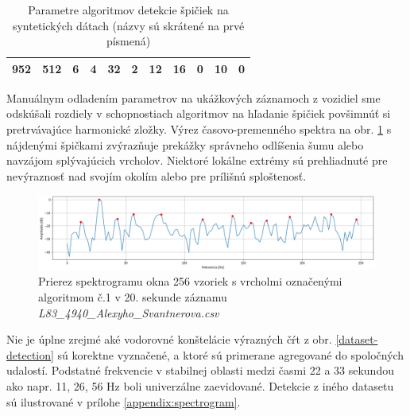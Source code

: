 \begin{table}[h]
\begin{tabular}{|c|c|ccc|cc|cccc|}
952                                                                               & 512                                                                     & \multicolumn{1}{c|}{6}           & \multicolumn{1}{c|}{4}                  & 32                & \multicolumn{1}{c|}{2}                                 & 12                                & \multicolumn{1}{c|}{16}  & \multicolumn{1}{c|}{0}   & \multicolumn{1}{c|}{10}  & 0   \\ \hline
\end{tabular}
\caption{Parametre algoritmov detekcie špičiek na syntetických dátach (názvy sú skrátené na prvé písmená)}
\label{tab:grid-serach-parameters}
\end{table}

Manuálnym odladením parametrov na ukážkových záznamoch z vozidiel sme odskúšali rozdiely v schopnostiach algoritmov
na hľadanie špičiek povšimnúť si pretrvávajúce harmonické zložky. Výrez časovo-premenného spektra na obr. \ref{spectrum-slice}
s nájdenými špičkami zvýrazňuje prekážky správneho odlíšenia šumu alebo navzájom splývajúcich vrcholov. Niektoré lokálne extrémy
sú prehliadnuté pre nevýraznosť nad svojím okolím alebo pre prílišnú sploštenosť.
\begin{figure}[h]
   \centering
    \includegraphics[width=\textwidth]{figures/verification/L83-slice-t-20-A1.png}
   \caption{Prierez spektrogramu okna 256 vzoriek s vrcholmi označenými algoritmom č.1
   v 20. sekunde záznamu \emph{L83\_4940\_Alexyho\_Svantnerova.csv}}
   \label{spectrum-slice}
\end{figure}

Nie je úplne zrejmé aké vodorovné konštelácie výrazných čŕt z obr. \ref{dataset-detection} sú korektne vyznačené,
a ktoré sú primerane agregované do spoločných udalostí. Podstatné frekvencie v stabilnej oblasti medzi časmi 22 a 33
sekundou ako napr. 11, 26, 56 Hz  boli univerzálne zaevidované. Detekcie z iného datasetu sú ilustrované v prílohe
\ref{appendix:spectrogram}.

